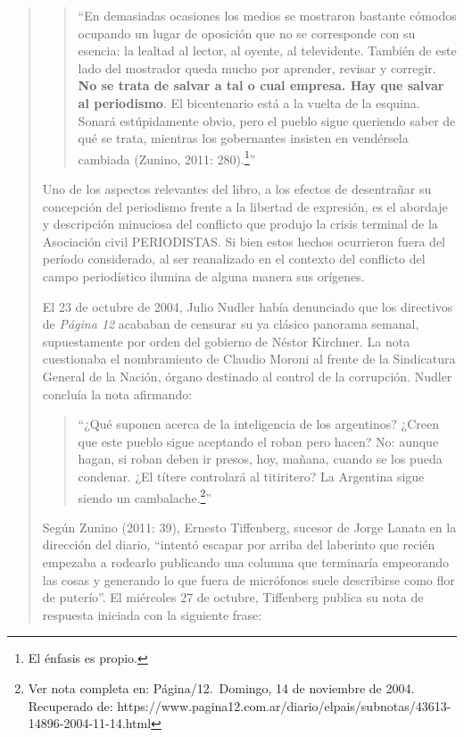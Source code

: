 \begin{quote}
\begin{quote}
	\enquote{En demasiadas ocasiones los medios se mostraron bastante cómodos ocupando un lugar de oposición que no se corresponde con su esencia: la lealtad al lector, al oyente, al televidente. También de este lado del mostrador queda mucho por aprender, revisar y corregir. \textbf{No se trata de salvar a tal o cual empresa. Hay que salvar al periodismo}. El bicentenario está a la vuelta de la esquina. Sonará estúpidamente obvio, pero el pueblo sigue queriendo saber de qué se trata, mientras los gobernantes insisten en vendérsela cambiada (Zunino, 2011: 280).\footnote{El énfasis es propio.}}
\end{quote}


Uno de los aspectos relevantes del libro, a los efectos de desentrañar su concepción del periodismo frente a la libertad de expresión, es el abordaje y descripción minuciosa del conflicto que produjo la crisis terminal de la Asociación civil PERIODISTAS. Si bien estos hechos ocurrieron fuera del período considerado, al ser reanalizado en el contexto del conflicto del campo periodístico ilumina de alguna manera sus orígenes.

El 23 de octubre de 2004, Julio Nudler había denunciado que los directivos de \emph{Página 12} acababan de censurar su ya clásico panorama semanal, supuestamente por orden del gobierno de Néstor Kirchner. La nota cuestionaba el nombramiento de Claudio Moroni al frente de la Sindicatura General de la Nación, órgano destinado  al control de la corrupción. Nudler concluía la nota afirmando:

\begin{quote}
	\enquote{¿Qué suponen acerca de la inteligencia de los argentinos? ¿Creen que este pueblo sigue aceptando el roban pero hacen? No: aunque hagan, si roban deben ir presos, hoy, mañana, cuando se los pueda condenar. ¿El títere controlará al titiritero? La Argentina sigue siendo un cambalache.\footnote{Ver nota completa en: Página/12. Domingo, 14 de noviembre de 2004. Recuperado de: https://www.pagina12.com.ar/diario/elpais/subnotas/43613-14896-2004-11-14.html}}
\end{quote}


Según Zunino (2011: 39), Ernesto Tiffenberg, sucesor de Jorge Lanata en la dirección del diario, ``intentó escapar por arriba del laberinto que recién empezaba a rodearlo publicando una columna que terminaría empeorando las cosas y generando lo que fuera de micrófonos suele describirse como flor de puterío''. El miércoles 27 de octubre, Tiffenberg publica su nota de respuesta iniciada con la siguiente frase:


\end{quote}
